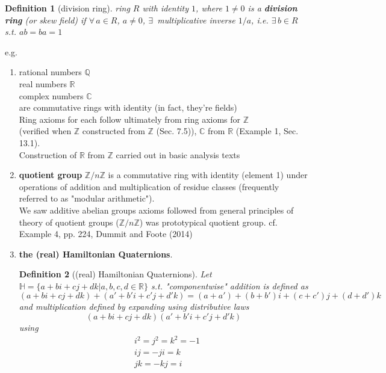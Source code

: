 \documentclass[10pt]{amsart}
\newtheorem{definition}{Definition}
\begin{document}
\begin{multicols*}{2}
\begin{definition}[division ring]
	ring $R$ with identity $1$, where $1\neq 0$ is a \textbf{division ring} (or skew field) if $\forall \, a \in R$, $a\neq 0$, $\exists \, $ multiplicative inverse $1/a$, i.e. $\exists \, b\in R$ s.t. $ab=ba = 1$
\end{definition}

e.g. 
\begin{enumerate}
	\item rational numbers $\mathbb{Q}$ \\
	real numbers $\mathbb{R}$ \\
	complex numbers $\mathbb{C}$ \\ 
	are commutative rings with identity (in fact, they're fields) \\
	Ring axioms for each follow ultimately from ring axioms for $\mathbb{Z}$ \\
	(verified when $\mathbb{Z}$ constructed from $\mathbb{Z}$ (Sec. 7.5)), $\mathbb{C}$ from $\mathbb{R}$ (Example 1, Sec. 13.1). \\
	Construction of $\mathbb{R}$ from $\mathbb{Z}$ carried out in basic analysis texts
	\item \textbf{quotient group} $\mathbb{Z}/n\mathbb{Z}$ is a commutative ring with identity (element 1) under operations of addition and multiplication of residue classes (frequently referred to as "modular arithmetic").  \\
	We saw additive abelian groups axioms followed from general principles of theory of quotient groups ($\mathbb{Z}/n\mathbb{Z}$) was prototypical quotient group. cf. Example 4, pp. 224, Dummit and Foote (2014)\cite{DuFo2003}
	\item \textbf{the (real) Hamiltonian Quaternions}.  
	\begin{definition}[(real) Hamiltonian Quaternions]
		Let $\mathbb{H} = \lbrace a+ bi + cj + dk | a,b,c,d \in \mathbb{R} \rbrace$ s.t. 
		"componentwise" addition is defined as 
		\begin{equation}
		(a+bi + cj+dk) + (a' + b'i + c'j + d'k) = (a+a') + (b+b')i + (c+c')j + (d+d')k
		\end{equation} and multiplication defined by expanding using distributive laws 
		\[
		(a+bi + cj +dk)(a' + b'i + c'j +d' k)
		\]
		using 
		\begin{equation}
		\begin{aligned}
		& i^2 = j^2 =k^2 = -1 \\
		& ij = -ji = k \\
		& jk = -kj = i \\

\end{aligned}
\end{equation}
\end{definition}
\end{enumerate}
\end{multicols*}
\end{document}
